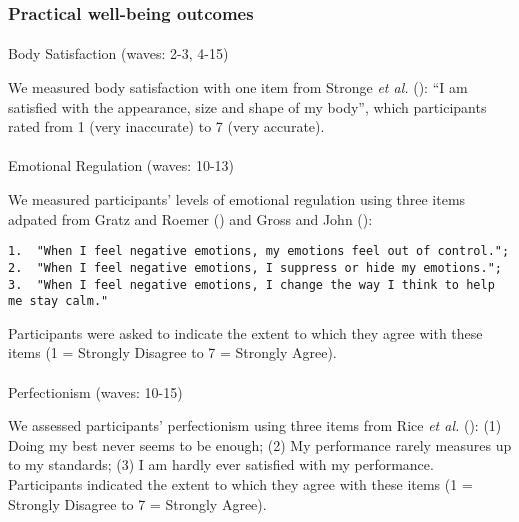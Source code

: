 \documentclass[
  singlecolumn,
  9pt]{article}
\makeatletter
\let\oldparagraph\paragraph
\renewcommand{\paragraph}{
    \@ifstar
      \xxxParagraphStar
      \xxxParagraphNoStar
  }
\newcommand{\xxxParagraphStar}[1]{\oldparagraph*{#1}\mbox{}}
\newcommand{\xxxParagraphNoStar}[1]{\oldparagraph{#1}\mbox{}}
\makeatother
\begin{document}
\subsubsection{Practical well-being
outcomes}\label{practical-well-being-outcomes}

\paragraph{Body Satisfaction (waves: 2-3,
4-15)}\label{body-satisfaction-waves-2-3-4-15}

We measured body satisfaction with one item from Stronge \emph{et al.}
(): ``I am satisfied with the
appearance, size and shape of my body'', which participants rated from 1
(very inaccurate) to 7 (very accurate).

\paragraph{Emotional Regulation (waves:
10-13)}\label{emotional-regulation-waves-10-13}

We measured participants' levels of emotional regulation using three
items adpated from Gratz and Roemer
() and Gross and John
():

\begin{verbatim}
1.  "When I feel negative emotions, my emotions feel out of control.";
2.  "When I feel negative emotions, I suppress or hide my emotions.";
3.  "When I feel negative emotions, I change the way I think to help me stay calm."
\end{verbatim}

Participants were asked to indicate the extent to which they agree with
these items (1 = Strongly Disagree to 7 = Strongly Agree).

\paragraph{Perfectionism (waves:
10-15)}\label{perfectionism-waves-10-15}

We assessed participants' perfectionism using three items from Rice
\emph{et al.} (): (1) Doing my best
never seems to be enough; (2) My performance rarely measures up to my
standards; (3) I am hardly ever satisfied with my performance.
Participants indicated the extent to which they agree with these items
(1 = Strongly Disagree to 7 = Strongly Agree).
\end{document}
